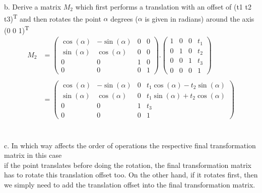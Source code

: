 \documentclass[10pt,a4paper]{article}
\begin{document}
b. Derive a matrix $M_2$ which first performs a translation with an offset of (t1 t2 t3)\textsuperscript{T}  and then rotates the point $\alpha$ degrees ($\alpha$ is given in radians) around the axis (0 0 1)\textsuperscript{T} \\

\begin{equation*} \label{eq_M1}
\begin{aligned}
M_2 &= 
  \begin{pmatrix}
    \cos(\alpha) & -\sin(\alpha) & 0 & 0 \\
    \sin(\alpha) & \cos(\alpha) & 0 & 0\\
    0 & 0 & 1 & 0 \\
    0 & 0 & 0 & 1
  \end{pmatrix} . 
    \begin{pmatrix}
    1 & 0 & 0 & t_1 \\
    0 & 1 & 0 & t_2\\
    0 & 0 & 1 & t_3 \\
    0 & 0 & 0 & 1
  \end{pmatrix} \\ \\
  &= 
  \begin{pmatrix}
    \cos(\alpha) & -\sin(\alpha) & 0 & t_1\cos(\alpha) - t_2\sin(\alpha) \\
    \sin(\alpha) & \cos(\alpha) & 0 & t_1\sin(\alpha) + t_2\cos(\alpha) \\
    0 & 0 & 1 & t_3 \\
    0 & 0 & 0 & 1
  \end{pmatrix}
\end{aligned}
\end{equation*} \\ \\


c. In which way affects the order of operations the respective final transformation matrix in this case \\
if the point translates before doing the rotation, the final transformation matrix has to rotate this translation offset too. On the other hand, if it rotates first, then we simply need to add the translation offset into the final transformation matrix. 
\end{document}
